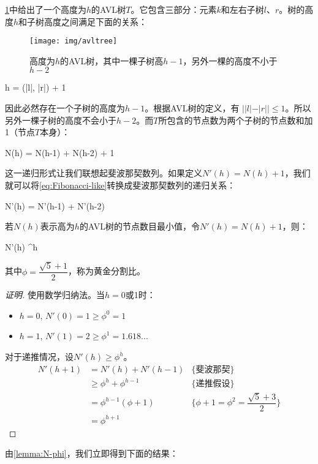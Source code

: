 \documentclass[b5paper]{ctexart}
\begin{document}
\cref{fig:N-h-relation}中给出了一个高度为$h$的AVL树$T$。它包含三部分：元素$k$和左右子树$l$、$r$。树的高度$h$和子树高度之间满足下面的关系：

\begin{figure}[htbp]
   \centering
   \texttt{[image: img/avltree]}
   \caption{高度为$h$的AVL树，其中一棵子树高$h - 1$，另外一棵的高度不小于$h - 2$}
   \label{fig:N-h-relation}
\end{figure}

\be
  h = \max(|l|, |r|) + 1
\ee

因此必然存在一个子树的高度为$h - 1$。根据AVL树的定义，有 $||l| -|r|| \leq 1$。所以另外一棵子树的高度不会小于$h - 2$。而$T$所包含的节点数为两个子树的节点数和加1（节点$T$本身）：

\be
  N(h) = N(h-1) + N(h-2) + 1
  \label{eq:Fibonacci-like}
\ee

这一递归形式让我们联想起斐波那契数列。如果定义$N'(h) = N(h) + 1$，我们就可以将\cref{eq:Fibonacci-like}转换成斐波那契数列的递归关系：

\be
  N'(h) = N'(h-1) + N'(h-2)
\ee

\begin{lemma}
\label{lemma:N-phi}
若$N(h)$表示高为$h$的AVL树的节点数目最小值，令$N'(h) = N(h) + 1$，则：

\be
  N'(h) \geq \phi^h
\ee

其中$\phi = \dfrac{\sqrt{5}+1}{2}$，称为黄金分割比。
\end{lemma}

\begin{proof}[证明]
使用数学归纳法。当$h = 0$或1时：
\begin{itemize}
\item $h = 0$, $N'(0) = 1 \geq \phi^0 = 1$
\item $h = 1$, $N'(1) = 2 \geq \phi^1 = 1.618...$
\end{itemize}

对于递推情况，设$N'(h) \geq \phi^h$。
\[
  \begin{array}{lll}
  N'(h+1) & = N'(h) + N'(h-1) & \{\text{斐波那契}\} \\
          & \geq \phi^h + \phi^{h-1} & \{\text{递推假设}\}\\
          & = \phi^{h-1}(\phi + 1) & \{\phi + 1 = \phi^2 = \dfrac{\sqrt{5}+3}{2}\} \\
          & = \phi^{h+1}
 \end{array}
\]
\end{proof}

由\cref{lemma:N-phi}，我们立即得到下面的结果：
\end{document}
